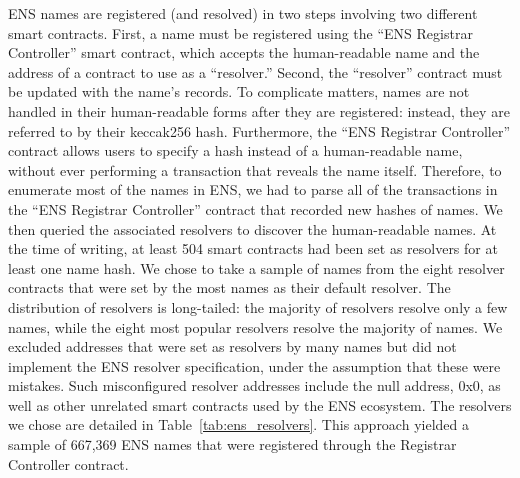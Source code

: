 ENS names are registered (and resolved) in two steps involving two different 
smart contracts. First, a name must be registered using the ``ENS Registrar 
Controller'' smart contract, which accepts the human-readable name and the 
address of a contract to use as a ``resolver.'' Second, the ``resolver'' 
contract must be updated with the name's records. To complicate matters, names 
are not handled in their human-readable forms after they are registered: 
instead, they are referred to by their keccak256 hash.  Furthermore, the ``ENS 
Registrar Controller'' contract allows users to specify a 
hash instead of a human-readable name, without ever performing a transaction 
that reveals the name itself. Therefore, to enumerate most of the names in ENS, 
we had to parse all of the transactions in the ``ENS Registrar Controller'' 
contract that recorded new hashes of names. We then queried the associated 
resolvers to discover the human-readable names. At the time of writing, at 
least 504 smart contracts had been set as resolvers for at least one name hash.
We chose to take a sample of names from the eight resolver contracts that were 
set by the most names as their default resolver. The distribution of resolvers 
is long-tailed: the majority of resolvers resolve only a few names, while the 
eight most popular resolvers resolve the majority of names. We excluded 
addresses that were set as resolvers by many names but did not implement the 
ENS resolver specification, under the assumption that these were mistakes. 
Such misconfigured resolver addresses include the null address, 0x0, as well as 
other unrelated smart contracts used by the ENS ecosystem. The resolvers we 
chose are detailed in Table~\ref{tab:ens_resolvers}. This approach yielded a 
sample of 667,369 ENS names that were registered through the Registrar 
Controller contract. 



